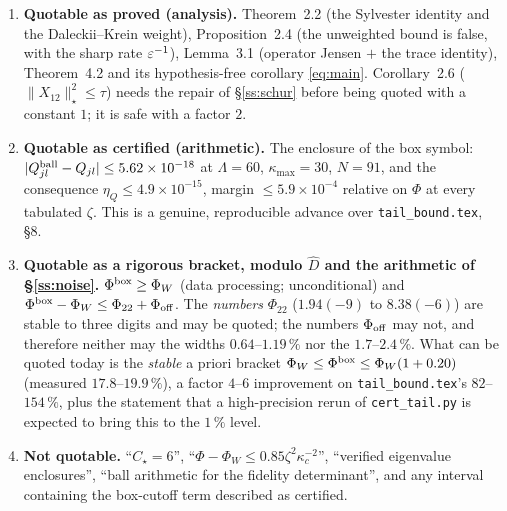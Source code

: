 \documentclass[11pt]{article}
\newcommand{\Nst}[1]{\lVert #1\rVert_{\star}}\newcommand{\Pinch}{\mathcal P}
\begin{document}
\begin{enumerate}[leftmargin=1.8em]
\item \textbf{Quotable as proved (analysis).}  Theorem~2.2 (the Sylvester identity and the
 Daleckii--Krein weight), Proposition~2.4 (the unweighted bound is false, with the sharp rate
 $\varepsilon^{-1}$), Lemma~3.1 (operator Jensen $+$ the trace identity), Theorem~4.2 and its
 hypothesis-free corollary \eqref{eq:main}.  Corollary~2.6 ($\Nst{X_{12}}^2\le\tau$) needs the
 repair of \S\ref{ss:schur} before being quoted with a constant $1$; it is safe with a factor $2$.
\item \textbf{Quotable as certified (arithmetic).}  The enclosure of the box symbol:
 $|Q^{\rm ball}_{jl}-Q_{jl}|\le5.62\times10^{-18}$ at $\Lambda=60$, $\kappa_{\max}=30$, $N=91$,
 and the consequence $\eta_Q\le4.9\times10^{-15}$, margin $\le5.9\times10^{-4}$ relative on $\Phi$
 at every tabulated $\zeta$.  This is a genuine, reproducible advance over
 \texttt{tail\_bound.tex}, \S8.
\item \textbf{Quotable as a rigorous bracket, modulo $\widehat D$ and the arithmetic of
 \S\ref{ss:noise}.}  $\Phi^{\rm box}\ge\Phi_W$ (data processing; unconditional) and
 $\Phi^{\rm box}-\Phi_W\le\Phi_{22}+\Phi_{\rm off}$.  The \emph{numbers} $\Phi_{22}$
 ($1.94(-9)$ to $8.38(-6)$) are stable to three digits and may be quoted; the numbers
 $\Phi_{\rm off}$ may not, and therefore neither may the widths $0.64$--$1.19\,\%$ nor the
 $1.7$--$2.4\,\%$.  What can be quoted today is the \emph{stable} a priori bracket
 $\Phi_W\le\Phi^{\rm box}\le\Phi_W(1+0.20)$ (measured $17.8$--$19.9\,\%$), a factor
 $4$--$6$ improvement on \texttt{tail\_bound.tex}'s $82$--$154\,\%$, plus the statement that a
 high-precision rerun of \texttt{cert\_tail.py} is expected to bring this to the $1\,\%$ level.
\item \textbf{Not quotable.}  ``$C_\star=6$'', ``$\Phi-\Phi_W\le0.85\zeta^2\kappa_c^{-2}$'',
 ``verified eigenvalue enclosures'', ``ball arithmetic for the fidelity determinant'', and any
 interval containing the box-cutoff term described as certified.
\end{enumerate}
\end{document}
